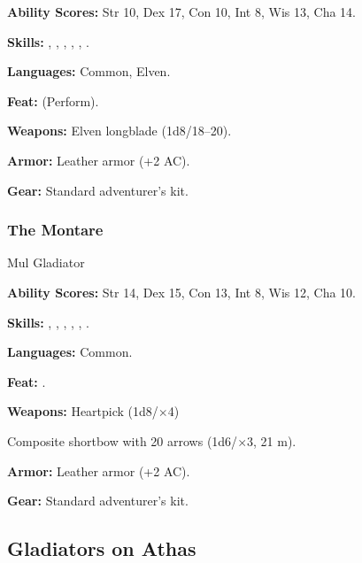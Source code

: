 \textbf{Ability Scores:} Str 10, Dex 17, Con 10, Int 8, Wis 13, Cha 14.

\textbf{Skills:} , , , , , .

\textbf{Languages:} Common, Elven.

\textbf{Feat:}  (Perform).

\textbf{Weapons:} Elven longblade (1d8/18--20).

\textbf{Armor:} Leather armor (+2 AC).

\textbf{Gear:} Standard adventurer's kit.

\subsubsection{The Montare}
Mul Gladiator

\textbf{Ability Scores:} Str 14, Dex 15, Con 13, Int 8, Wis 12, Cha 10.

\textbf{Skills:} , , , , , .

\textbf{Languages:} Common.

\textbf{Feat:} .

\textbf{Weapons:} Heartpick (1d8/$\times$4)

Composite shortbow with 20 arrows (1d6/$\times$3, 21 m).

\textbf{Armor:} Leather armor (+2 AC).

\textbf{Gear:} Standard adventurer's kit.

\subsection{Gladiators on Athas}

